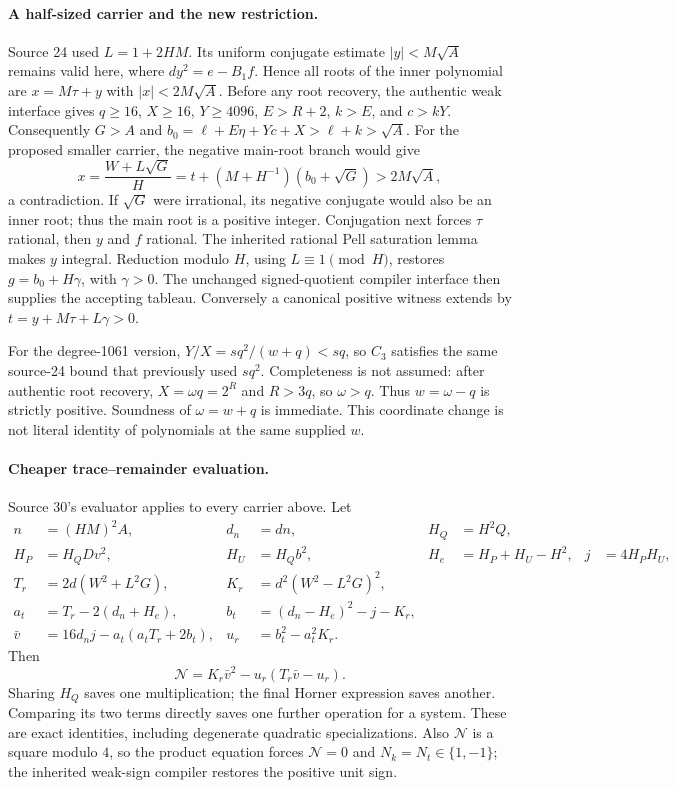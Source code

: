 \paragraph{A half-sized carrier and the new restriction.}
Source 24 used $L=1+2HM$.  Its uniform conjugate estimate
$|y|<M\sqrt A$ remains valid here, where
$dy^2=e-B_1f$.  Hence all roots of the inner polynomial are
$x=M\tau+y$ with $|x|<2M\sqrt A$.
Before any root recovery, the authentic weak interface gives
$q\ge16$, $X\ge16$, $Y\ge4096$, $E>R+2$, $k>E$, and $c>kY$.
Consequently $G>A$ and
$b_0=\ell+E\eta+Yc+X>\ell+k>\sqrt A$.
For the proposed smaller carrier, the negative main-root branch would give
\[
 x=\frac{W+L\sqrt G}{H}
   =t+(M+H^{-1})(b_0+\sqrt G)>2M\sqrt A,
\]
a contradiction.  If $\sqrt G$ were irrational, its negative conjugate
would also be an inner root; thus the main root is a positive integer.
Conjugation next forces $\tau$ rational, then $y$ and $f$ rational.
The inherited rational Pell saturation lemma makes $y$ integral.
Reduction modulo $H$, using $L\equiv1\pmod H$, restores
$g=b_0+H\gamma$, with $\gamma>0$.  The unchanged signed-quotient compiler
interface then supplies the accepting tableau.  Conversely a canonical
positive witness extends by $t=y+M\tau+L\gamma>0$.

For the degree-1061 version, $Y/X=sq^2/(w+q)<sq$, so $C_3$ satisfies the
same source-24 bound that previously used $sq^2$.  Completeness is not
assumed: after authentic root recovery, $X=\omega q=2^R$ and $R>3q$,
so $\omega>q$.  Thus $w=\omega-q$ is strictly positive.  Soundness of
$\omega=w+q$ is immediate.  This coordinate change is not literal identity
of polynomials at the same supplied $w$.

\paragraph{Cheaper trace--remainder evaluation.}
Source 30's evaluator applies to every carrier above.  Let
\begin{align*}
 n&=(HM)^2A,&d_n&=dn,&H_Q&=H^2Q,\\
 H_P&=H_QDv^2,&H_U&=H_Qb^2,&H_e&=H_P+H_U-H^2,&j&=4H_PH_U,\\
 T_r&=2d(W^2+L^2G),&K_r&=d^2(W^2-L^2G)^2,\\
 a_t&=T_r-2(d_n+H_e),&b_t&=(d_n-H_e)^2-j-K_r,\\
 \bar v&=16d_nj-a_t(a_tT_r+2b_t),&u_r&=b_t^2-a_t^2K_r.
\end{align*}
Then
\[
 \mathcal N=K_r\bar v^2-u_r(T_r\bar v-u_r).
\]
Sharing $H_Q$ saves one multiplication; the final Horner expression saves
another.  Comparing its two terms directly saves one further operation
for a system.  These are exact identities, including degenerate quadratic
specializations.  Also $\mathcal N$ is a square modulo $4$, so the product
equation forces $\mathcal N=0$ and $N_k=N_t\in\{1,-1\}$; the inherited
weak-sign compiler restores the positive unit sign.

